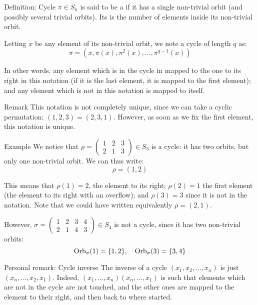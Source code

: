 \documentclass[a4paper]{article}
\begin{document}
\begin{parag}{Definition: Cycle}
    $\pi \in S_n$ is said to be a  if it has a single non-trivial orbit (and possibly several trivial orbits). Its  is the number of elements inside its non-trivial orbit.

    Letting $x$ be any element of its non-trivial orbit, we note a cycle of length $q$ as: 
    \[\pi = \left(x, \pi\left(x\right), \pi^2\left(x\right), \ldots, \pi^{q-1}\left(x\right)\right)\]
    
    In other words, any element which is in the cycle in mapped to the one to its right in this notation (if it is the last element, it is mapped to the first element); and any element which is not in this notation is mapped to itself.

    \begin{subparag}{Remark}
        This notation is not completely unique, since we can take a cyclic permutation: $\left(1, 2, 3\right) = \left(2, 3, 1\right)$. However, as soon as we fix the first element, this notation is unique.
    \end{subparag}

    \begin{subparag}{Example}
        We notice that $\rho = \begin{pmatrix} 1 & 2 & 3 \\ 2 & 1 & 3 \end{pmatrix} \in S_3$ is a cycle: it has two orbits, but only one non-trivial orbit. We can thus write: 
        \[\rho = \left(1, 2\right)\]

        This means that $\rho\left(1\right) = 2$, the element to its right; $\rho\left(2\right) = 1$ the first element (the element to its right with an overflow); and $\rho\left(3\right) = 3$ since it is not in the notation. Note that we could have written equivalently $\rho = \left(2, 1\right)$.

        However, $\sigma = \begin{pmatrix} 1 & 2 & 3 & 4 \\ 2 & 1 & 4 & 3 \end{pmatrix} \in S_4 $ is not a cycle, since it has two non-trivial orbits: 
        \[\text{Orb}_{\sigma}\left(1\right) = \left\{1, 2\right\}, \mathspace \text{Orb}_{\sigma}\left(3\right) = \left\{3, 4\right\}\]
    \end{subparag}
\end{parag}

\begin{parag}{Personal remark: Cycle inverse}
    The inverse of a cycle $\left(x_1, x_2, \ldots, x_n\right)$ is just $\left(x_n, \ldots, x_2, x_1\right)$. Indeed, $\left(x_1, \ldots, x_n\right)\left(x_n, \ldots, x_1\right)$ is such that elements which are not in the cycle are not touched, and the other ones are mapped to the element to their right, and then back to where started. 
\end{parag}
\end{document}
